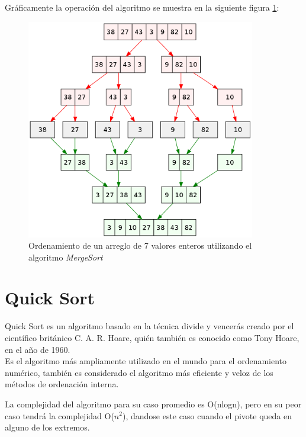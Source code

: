     Gráficamente la operación del algoritmo se muestra en la siguiente figura \ref{OperacionMergeSort}:
    \begin{figure}[h!]
        \centering
        \includegraphics[width=10cm]{OperacionMergeSort.png}
        \caption{Ordenamiento de un arreglo de 7 valores enteros utilizando el algoritmo \textit{MergeSort}}
        \label{OperacionMergeSort}
    \end{figure}
    
\section*{Quick Sort}
    Quick Sort es un algoritmo basado en la técnica divide y vencerás creado por el científico británico C. A. R. Hoare, quién también es conocido como Tony Hoare, en el año de 1960.\\
    
    Es el algoritmo más ampliamente utilizado en el mundo para el ordenamiento numérico, también es considerado el algoritmo más eficiente y veloz de los métodos de ordenación interna.
    
    La complejidad del algoritmo para su caso promedio es O(nlogn), pero en su peor caso tendrá la complejidad O($n^2$), dandose este caso cuando el pivote queda en alguno de los extremos.
    
